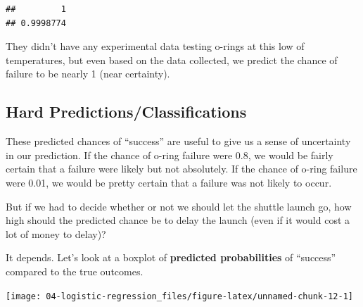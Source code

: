 \documentclass[
]{book}
\newenvironment{Shaded}{\begin{snugshade}}{\end{snugshade}}
\newcommand{\DataTypeTok}[1]{\textcolor[rgb]{0.13,0.29,0.53}{#1}}
\newcommand{\KeywordTok}[1]{\textcolor[rgb]{0.13,0.29,0.53}{\textbf{#1}}}
\newcommand{\NormalTok}[1]{#1}
\newcommand{\OperatorTok}[1]{\textcolor[rgb]{0.81,0.36,0.00}{\textbf{#1}}}
\newcommand{\StringTok}[1]{\textcolor[rgb]{0.31,0.60,0.02}{#1}}
\begin{document}
\begin{verbatim}
##         1 
## 0.9998774
\end{verbatim}

They didn't have any experimental data testing o-rings at this low of temperatures, but even based on the data collected, we predict the chance of failure to be nearly 1 (near certainty).

\hypertarget{hard-predictionsclassifications}{%
\subsection{Hard Predictions/Classifications}\label{hard-predictionsclassifications}}

These predicted chances of ``success'' are useful to give us a sense of uncertainty in our prediction. If the chance of o-ring failure were 0.8, we would be fairly certain that a failure were likely but not absolutely. If the chance of o-ring failure were 0.01, we would be pretty certain that a failure was not likely to occur.

But if we had to decide whether or not we should let the shuttle launch go, how high should the predicted chance be to delay the launch (even if it would cost a lot of money to delay)?

It depends. Let's look at a boxplot of \textbf{predicted probabilities} of ``success'' compared to the true outcomes.

\begin{Shaded}
\end{Shaded}

\begin{center}\texttt{[image: 04-logistic-regression\_files/figure-latex/unnamed-chunk-12-1]} \end{center}
\end{document}

